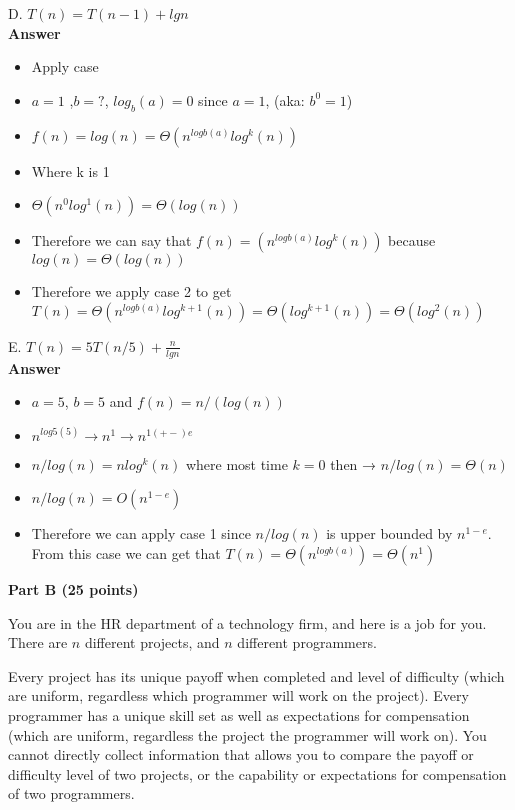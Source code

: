 \documentclass{article}
\begin{document}
\noindent D. $T(n) = T(n-1) + lgn$\\

\textbf{ Answer }
\begin{itemize}
\item Apply case 
\item $a = 1$ ,$b = ?$, $log_{b}(a) = 0$ since $a = 1$, (aka: $b^{0} = 1$)
\item $f(n) = log(n) = \Theta(n^{logb(a)}log^{k}(n))$
\item Where k is 1
\item $\Theta(n^{0}log^{1}(n)) = \Theta(log(n))$
\item Therefore we can say that $f(n) = (n^{logb(a)}log^{k}(n))$ because $log(n) = \Theta(log(n))$
\item Therefore we apply case 2 to get $T(n) = \Theta(n^{logb(a)}log^{k+1}(n)) = \Theta(log^{k+1}(n)) = \Theta(log^{2}(n))$
\end{itemize}

\noindent E. $T(n) = 5T(n/5) + \frac{n}{lgn}$\\

\textbf{ Answer }
\begin{itemize}
\item $a = 5$, $b = 5$ and $f(n) = n/(log(n))$
\item $n^{log5(5)} → n^{1} → n^{1(+-)e}$ 
\item $n/log(n) = nlog^{k}(n)$ where most time $k = 0$ then → $n/log(n) = \Theta(n)$
\item $n/log(n) = O(n^{1-e})$
\item Therefore we can apply case 1 since $n/log(n)$ is upper bounded by $n^{1-e}$. From this case we can get that $T(n) = \Theta(n^{logb(a)}) = \Theta(n^{1})$
\end{itemize}


\begin{center}
{\bf Part B (25 points)}
\end{center}

 You are in the HR department of a
technology firm, and here is a job for you.  There are $n$ different
projects, and $n$ different programmers.

Every project has its unique payoff when completed and level of
difficulty (which are uniform, regardless which programmer will work
on the project).  Every programmer has a unique skill set as well as
expectations for compensation (which are uniform, regardless the
project the programmer will work on). You cannot directly collect
information that allows you to compare the payoff or difficulty level
of two projects, or the capability or expectations for compensation of
two programmers.
\end{document}
